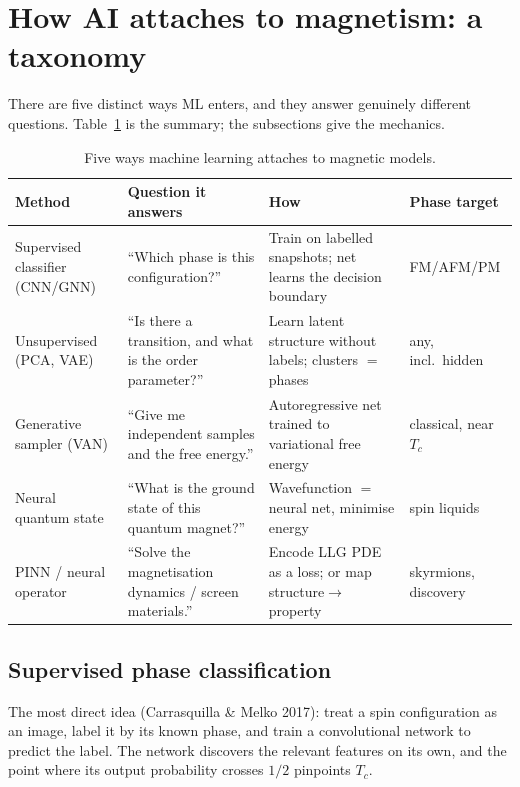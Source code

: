 \documentclass[11pt]{article}
\begin{document}
\section{How AI attaches to magnetism: a taxonomy}
There are five distinct ways ML enters, and they answer genuinely different questions.
Table~\ref{tab:map} is the summary; the subsections give the mechanics.

\begin{table}[h]
\centering\small
\caption{Five ways machine learning attaches to magnetic models.}
\label{tab:map}
\begin{tabular}{@{}p{3.5cm}p{4.3cm}p{4.6cm}p{2.4cm}@{}}
\toprule
Method & Question it answers & How & Phase target \\
\midrule
Supervised classifier (CNN/GNN) & ``Which phase is this configuration?'' & Train on labelled snapshots; net learns the decision boundary & FM/AFM/PM \\[2pt]
Unsupervised (PCA, VAE) & ``Is there a transition, and what is the order parameter?'' & Learn latent structure without labels; clusters $=$ phases & any, incl.\ hidden \\[2pt]
Generative sampler (VAN) & ``Give me independent samples and the free energy.'' & Autoregressive net trained to variational free energy & classical, near $T_c$ \\[2pt]
Neural quantum state & ``What is the ground state of this quantum magnet?'' & Wavefunction $=$ neural net, minimise energy & spin liquids \\[2pt]
PINN / neural operator & ``Solve the magnetisation dynamics / screen materials.'' & Encode LLG PDE as a loss; or map structure$\to$property & skyrmions, discovery \\
\bottomrule
\end{tabular}
\end{table}

\subsection{Supervised phase classification}
The most direct idea (Carrasquilla \& Melko 2017): treat a spin configuration as an image,
label it by its known phase, and train a convolutional network to predict the label. The
network discovers the relevant features on its own, and the point where its output
probability crosses $1/2$ pinpoints $T_c$.
\end{document}
